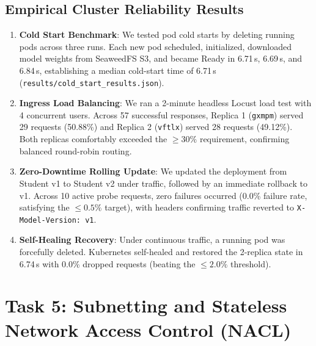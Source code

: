 \documentclass[10pt,a4paper]{article}
\begin{document}
\subsection{Empirical Cluster Reliability Results}
\begin{enumerate}
    \item \textbf{Cold Start Benchmark}: We tested pod cold starts by deleting running pods across three runs. Each new pod scheduled, initialized, downloaded model weights from SeaweedFS S3, and became Ready in 6.71\,s, 6.69\,s, and 6.84\,s, establishing a median cold-start time of 6.71\,s (\texttt{results/cold\_start\_results.json}).
    \item \textbf{Ingress Load Balancing}: We ran a 2-minute headless Locust load test with 4 concurrent users. Across 57 successful responses, Replica 1 (\texttt{gxmpm}) served 29 requests (50.88\%) and Replica 2 (\texttt{vftlx}) served 28 requests (49.12\%). Both replicas comfortably exceeded the $\ge 30\%$ requirement, confirming balanced round-robin routing.
    \item \textbf{Zero-Downtime Rolling Update}: We updated the deployment from Student v1 to Student v2 under traffic, followed by an immediate rollback to v1. Across 10 active probe requests, zero failures occurred (0.0\% failure rate, satisfying the $\le 0.5\%$ target), with headers confirming traffic reverted to \texttt{X-Model-Version: v1}.
    \item \textbf{Self-Healing Recovery}: Under continuous traffic, a running pod was forcefully deleted. Kubernetes self-healed and restored the 2-replica state in 6.74\,s with 0.0\% dropped requests (beating the $\le 2.0\%$ threshold).
\end{enumerate}

\section{Task 5: Subnetting and Stateless Network Access Control (NACL)}
\end{document}
